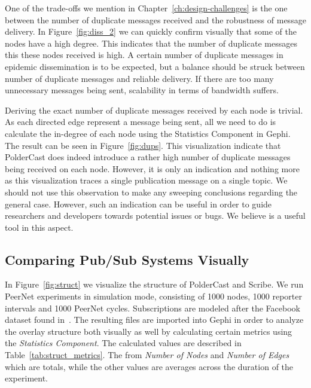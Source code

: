 One of the trade-offs we mention in Chapter~\ref{ch:design-challenges}
is the one between the number of duplicate messages received and the
robustness of message delivery. In Figure~\ref{fig:diss_2} we can
quickly confirm visually that some of the nodes have a high degree. This
indicates that the number of duplicate messages this these nodes
received is high. A certain number of duplicate messages in epidemic
dissemination is to be expected, but a balance should be struck between
number of duplicate messages and reliable delivery. If there are too
many unnecessary messages being sent, scalability in terms of bandwidth
suffers.

Deriving the exact number of duplicate messages received by each node is
trivial. As each directed edge represent a message being sent, all we
need to do is calculate the in-degree of each node using the Statistics
Component in Gephi. The result can be seen in Figure~\ref{fig:dups}.
This visualization indicate that PolderCast does indeed introduce a
rather high number of duplicate messages being received on each node.
However, it is only an indication and nothing more as this visualization
traces a single publication message on a single topic. We should not use
this observation to make any sweeping conclusions regarding the general
case. However, such an indication can be useful in order to guide
researchers and developers towards potential issues or bugs. We believe
\demo is a useful tool in this aspect.

\subsection{Comparing Pub/Sub Systems Visually}
\label{sec:comparing}

In Figure~\ref{fig:struct} we visualize the structure of PolderCast and
Scribe. We run PeerNet experiments in simulation mode, consisting of
1000 nodes, 1000 reporter intervals and 1000 PeerNet cycles.
Subscriptions are modeled after the Facebook dataset found
in~\cite{facebook-eurosys09}. The resulting \gexf{} files are imported into Gephi
in order to analyze the overlay structure both visually as well by
calculating certain metrics using the \emph{Statistics Component}. The
calculated values are described in Table~\ref{tab:struct_metrics}. The
from \emph{Number of Nodes} and \emph{Number of Edges} which are totals,
while the other values are averages across the duration of the experiment.

